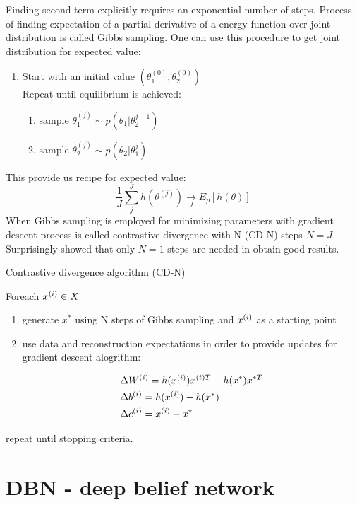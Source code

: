 Finding second term explicitly requires an exponential number of steps. Process of finding expectation of a partial derivative of a energy function over joint distribution is called Gibbs sampling. One can use this procedure to get joint distribution for expected value:

\begin{enumerate}
	\item Start with an initial value $(\theta_1^{(0)}, \theta_2^{(0)})$ \\

Repeat until equilibrium is achieved:
\begin{indenva}
\begin{enumerate}
	\item sample $\theta_1^{(j)} \sim p(\theta_1|\theta_2^{j-1})$
	\item sample $\theta_2^{(j)} \sim p(\theta_2|\theta_1^{j})$
\end{enumerate}
\end{indenva}
\end{enumerate}

This provide us recipe for expected value:
\begin{equation}
	\frac{1}{J} \sum_j^J h(\theta^{(j)}) \underset{J}\rightarrow E_p \left[ h(\theta) \right]
\end{equation}
When Gibbs sampling is employed for minimizing parameters with gradient descent process is called contrastive divergence with N (CD-N) steps $N=J$. Surprisingly \textcite{hinton_fast_2006} showed that only $N=1$ steps are needed in obtain good results.

\begin{algorithm} Contrastive divergence algorithm (CD-N)
\item Foreach $x^{(i)} \in X$ \\

\begin{indenva}
\begin{enumerate}
	\item generate $x^{*}$ using N steps of Gibbs sampling and $x^{(i)}$ as a starting point
	\item use data and reconstruction expectations in order to provide updates for gradient descent alogrithm:
\begin{indenvb}
	\begin{align}
		&\Delta W^{(i)} =  h(x^{(i)})x^{(t)T} - h(x^*)x^{*T} \\
		&\Delta b^{(i)} =  h(x^{(i)}) - h(x^*) \\
		&\Delta c^{(i)} =  x^{(i)} - x^*
	\end{align}
\end{indenvb}
\end{enumerate}
\end{indenva}
\item repeat until stopping criteria.
\end{algorithm}

\section{DBN - deep belief network}
